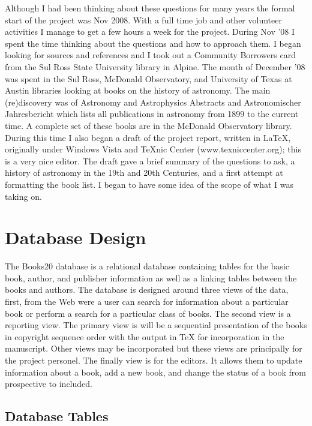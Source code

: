\documentclass{article}
\begin{document}
Although I had been thinking about these questions for many years the
formal start of the project was Nov 2008. With a full time job and
other volunteer activities I manage to get a few hours a week for the
project. During Nov '08 I spent the time thinking about the questions
and how to approach them.  I began looking for sources and references
and I took out a Community Borrowers card from the Sul Ross State
University library in Alpine.  The month of December '08 was spent in
the Sul Ross, McDonald Observatory, and University of Texas at Austin
libraries looking at books on the history of astronomy. The main
(re)discovery was of Astronomy and Astrophysics Abstracts and
Astronomischer Jahresbericht which lists all publications in astronomy
from 1899 to the current time. A complete set of these books are in
the McDonald Observatory library. During this time I also began a
draft of the project report, written in LaTeX, originally under
Windows Vista and TeXnic Center (www.texniccenter.org); this is a very
nice editor.  The draft gave a brief summary of the questions to ask,
a history of astronomy in the 19th and 20th Centuries, and a first
attempt at formatting the book list.  I began to have some idea of the
scope of what I was taking on.


%
%
\section{Database Design}

The Books20 database is a relational database containing tables for
the basic book, author, and publisher information as well as a linking
tables between the books and authors.  The database is designed around
three views of the data, first, from the Web were a user can search
for information about a particular book or perform a search for a
particular class of books.  The second view is a reporting view. The
primary view is will be a sequential presentation of the books in
copyright sequence order with the output in TeX for incorporation in
the manuscript. Other views may be incorporated but these views are
principally for the project personel. The finally view is for the
editors.  It allows them to update information about a book, add a new
book, and change the status of a book from prospective to included.

\subsection{Database Tables}
\end{document}
